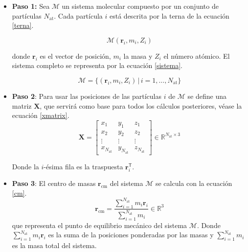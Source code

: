 	\begin{itemize}
		\item \textbf{Paso 1:}
		Sea $\mathcal{M}$ un sistema molecular compuesto por un conjunto de partículas $N_{\text{at}}$. Cada partícula $i$ está descrita por la terna de la ecuación \ref{terna}.
		
		\begin{equation}
			\mathcal{M} (\mathbf{r}_i, m_i, Z_i)
			\label{terna}
		\end{equation}
		
		donde $\mathbf{r}_i$ es el vector de posición, $m_i$ la masa y $Z_i$ el número atómico. El sistema completo se representa por la ecuación \ref{sistema}.	
		
		\begin{equation}
			\mathcal{M} = \bigl\{(\mathbf{r}_i, m_i, Z_i) \,\big|\, i = 1,\dots,N_{\text{at}}\bigr\}
			\label{sistema}
		\end{equation}
	
		\item \textbf{Paso 2}: Para usar las posiciones de las partículas $i$ de $\mathcal{M}$ se define una matriz $\mathbf{X}$, que servirá como base para todos los cálculos posteriores, véase la ecuación \ref{xmatrix}.
		\begin{equation}
			\mathbf{X} = \begin{bmatrix}
				x_1 & y_1 & z_1 \\
				x_2 & y_2 & z_2 \\
				\vdots & \vdots & \vdots \\
				x_{N_{\text{at}}} & y_{N_{\text{at}}} & z_{N_{\text{at}}}
			\end{bmatrix} \in \mathbb{R}^{N_{\text{at}} \times 3}
			\label{xmatrix}
		\end{equation}
		
		Donde la $i$-ésima fila es la traspuesta $\mathbf{r}_i^{\mathsf T}$.
		
		
		\item \textbf{Paso 3}: El centro de masas $\mathbf{r}_{\text{cm}}$ del sistema $\mathcal{M}$ se calcula con la ecuación \ref{cm}.
		\begin{equation}
			\mathbf{r}_{\text{cm}}
			= \frac{\displaystyle \sum_{i=1}^{N_{\text{at}}} m_i \mathbf{r}_i}
			{\displaystyle \sum_{i=1}^{N_{\text{at}}} m_i}
			\in \mathbb{R}^3
			\label{cm}
		\end{equation}
		que representa el punto de equilibrio mecánico del sistema $\mathcal{M}$. 
		Donde $\displaystyle \sum_{i=1}^{N_{\text{at}}} m_i \mathbf{r}_i$ es la suma de la posiciones ponderadas por las masas y $\displaystyle \sum_{i=1}^{N_{\text{at}}} m_i$ es la masa total del sistema.
		

\end{itemize}
